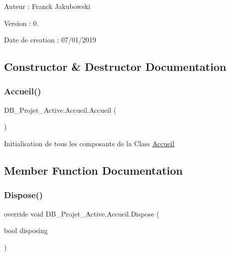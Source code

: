 Auteur \+: Franck Jakubowski

Version \+: 0.

Date de creation \+: 07/01/2019

\subsection{Constructor \& Destructor Documentation}
\mbox{\label{class_d_b___projet___active_1_1_accueil_a92cda60f41572a1a2c3c24eeb6376821}} 
\subsubsection{\texorpdfstring{Accueil()}{Accueil()}}
{\footnotesize\ttfamily D\+B\+\_\+\+Projet\+\_\+\+Active.\+Accueil.\+Accueil (\begin{DoxyParamCaption}{ }\end{DoxyParamCaption})}



Initialisation de tous les composants de la Class \mbox{\hyperlink{class_d_b___projet___active_1_1_accueil}{Accueil}} 



\subsection{Member Function Documentation}
\mbox{\label{class_d_b___projet___active_1_1_accueil_a493877105848f55b96ea494895acb0a6}} 
\subsubsection{\texorpdfstring{Dispose()}{Dispose()}}
{\footnotesize\ttfamily override void D\+B\+\_\+\+Projet\+\_\+\+Active.\+Accueil.\+Dispose (\begin{DoxyParamCaption}\item[{bool}]{disposing }\end{DoxyParamCaption})\hspace{0.3cm}{\ttfamily [protected]}}



